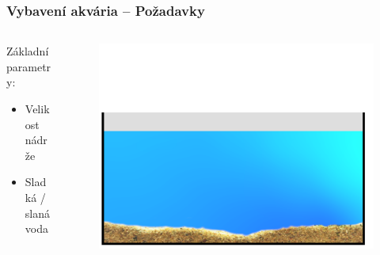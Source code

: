 \documentclass[%
  12pt,       				%
	t,                  %
	aspectratio=1610,   %
	unicode,						%
]{beamer}				    	%
\begin{document}
\begin{frame} 
	\frametitle{Vybavení akvária -- Požadavky}
	
	\begin{columns}[T] 								%
		\begin{column}{0.4\textwidth}		%
			Základní parametry:\\[2ex]
			\begin{itemize}
				\item Velikost nádrže
				\item Sladká / slaná voda
			\end{itemize}
		\end{column}
		\begin{column}{0.6\textwidth}		%
			\begin{figure}%
				\centering
				\includegraphics[width=\columnwidth]{obrazky/prezentace/vybaveni-akvaria/01-prazdne.png}
			\end{figure}
		\end{column}
	\end{columns}											%
\end{frame}
\end{document}
